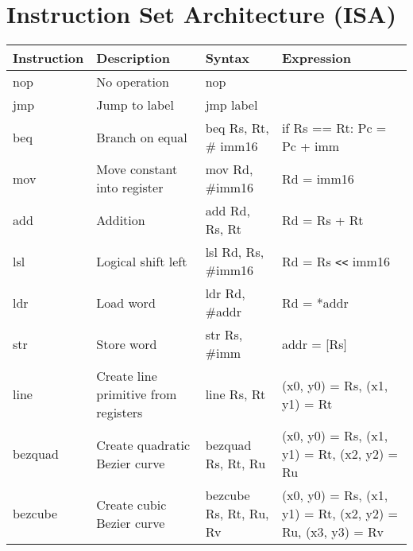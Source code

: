 \chapter{Instruction Set Architecture (ISA)}
\label{app:isa}
\begin{table}[H]
    \begin{tabular}{|p{2.1cm}|p{4cm}|p{4cm}|p{3cm}|}
    \hline
    \textbf{Instruction} & \textbf{Description}        & \textbf{Syntax}        & \textbf{Expression}                                                 \\ \hline
    nop         & No operation                         & nop                    & ~                                                          \\ \hline
    jmp         & Jump to label                        & jmp label              & ~                                                          \\ \hline
    beq         & Branch on equal                      & beq Rs, Rt, \# imm16   & if Rs == Rt: Pc = Pc + imm                            \\ \hline
    mov         & Move constant into register          & mov Rd, \#imm16        & Rd = imm16                                                 \\ \hline
    add         & Addition                             & add Rd, Rs, Rt         & Rd = Rs + Rt                                               \\ \hline
    lsl         & Logical shift left                   & lsl Rd, Rs, \#imm16    & Rd = Rs \verb|<<| imm16                                           \\ \hline
    ldr         & Load word                            & ldr Rd, \#addr         & Rd = *addr                                                 \\ \hline
    str         & Store word                           & str Rs, \#imm          & addr = [Rs]                                                \\ \hline
    line        & Create line primitive from registers & line Rs, Rt            & (x0, y0) = Rs, (x1, y1) = Rt                               \\ \hline
    bezquad     & Create quadratic Bezier curve        & bezquad Rs, Rt, Ru     & (x0, y0) = Rs, (x1, y1) = Rt, (x2, y2) = Ru                \\ \hline
    bezcube     & Create cubic Bezier curve            & bezcube Rs, Rt, Ru, Rv & (x0, y0) = Rs, (x1, y1) = Rt, (x2, y2) = Ru, (x3, y3) = Rv \\ \hline

\end{tabular}
\end{table}
